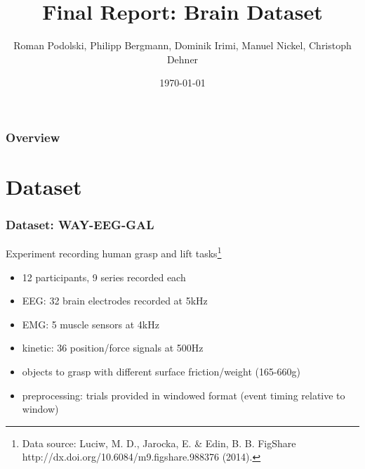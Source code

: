 \documentclass{beamer}
\title[Brain dataset]{Final Report: Brain Dataset} %
\author{Roman Podolski, Philipp Bergmann, Dominik Irimi, Manuel Nickel, Christoph Dehner} %
\institute[TUM] %
{
Technische Universit\"at M\"unchen \\ %
\medskip
\textit{roman.podolski@tum.de, philipp.bergmann@tum.de, dominik.irimi@tum.de, manuel.nickel@tum.de, dehner@in.tum.de} %
}
\date{\today} %
\begin{document}
\begin{frame}
\titlepage %
\end{frame}

\begin{frame}
\frametitle{Overview} %
\tableofcontents %
\end{frame}


\section{Dataset} %


\begin{frame}
\frametitle{Dataset: WAY-EEG-GAL}
Experiment recording human grasp and lift tasks\footnote{Data source: Luciw, M. D., Jarocka, E. \& Edin, B. B. FigShare http://dx.doi.org/10.6084/m9.figshare.988376 (2014).}
\begin{itemize}
	\item 12 participants, 9 series recorded each
	\item EEG: 32 brain electrodes recorded at 5kHz
	\item EMG: 5 muscle sensors at 4kHz
	\item kinetic: 36 position/force signals at 500Hz
	\item objects to grasp with different surface friction/weight (165-660g)
	\item preprocessing: trials provided in windowed format (event timing relative to window)
\end{itemize}
\end{frame}
\end{document}
